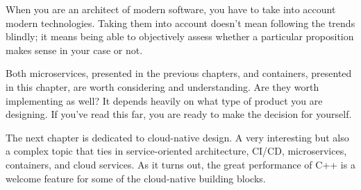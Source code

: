 When you are an architect of modern software, you have to take into account modern technologies. Taking them into account doesn't mean following the trends blindly; it means being able to objectively assess whether a particular proposition makes sense in your case or not.

Both microservices, presented in the previous chapters, and containers, presented in this chapter, are worth considering and understanding. Are they worth implementing as well? It depends heavily on what type of product you are designing. If you've read this far, you are ready to make the decision for yourself.

The next chapter is dedicated to cloud-native design. A very interesting but also a complex topic that ties in service-oriented architecture, CI/CD, microservices, containers, and cloud services. As it turns out, the great performance of C++ is a welcome feature for some of the cloud-native building blocks.